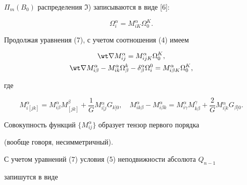 $\Pi_m(B_0)$ распределения $\Im$) записываются в виде [6]: 


\begin{equation} 


\Omega^\alpha_i=M^\alpha_{iK}\Omega^K_0. 


\end{equation} 


 


Продолжая уравнения (7), с учетом соотношения (4) имеем 


\begin{gather} 


\wt\nabla M^\alpha_{ij}=M^\alpha_{ijK}\Omega^K_0,\\ 


% 


\wt\nabla M^\alpha_{i\beta}-M^\alpha_{ik}\Omega^k_\beta- 


\delta^\alpha_\beta\Omega^0_i=M^\alpha_{i\beta K} 


\Omega^K_0,\notag 


\end{gather} 


где 


$$ 


M^\alpha_{i[jk]}=M^\alpha_{i\beta}M^\beta_{[jk]}+\frac{1}{G} 


M{}^\alpha_{i[j}G{}_{k]0},\quad M^\alpha_{ik\beta}- 


M^\alpha_{i\beta k}=M^\alpha_{i\gamma}M^\gamma_{k\beta}+ 


\frac{2}{G}M{}^\alpha_{i[k}G{}_{\beta]0}. 


$$ 


Совокупность функций $\{M^\alpha_{ij}\}$ образует тензор первого порядка 


(вообще говоря, несимметричный). 


 


С учетом уравнений (7) условия (5) неподвижности абсолюта $Q_{n-1}$ 


запишутся в виде 


